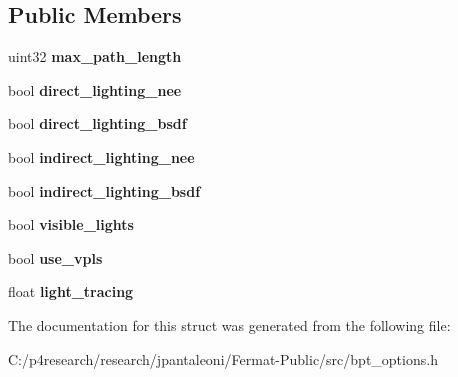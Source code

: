 \subsection*{Public Members}
\begin{DoxyCompactItemize}
\item 
\mbox{\label{struct_b_p_t_options_base_a3d1664d4b59cacc36200da960da90cdc}} 
uint32 {\bfseries max\+\_\+path\+\_\+length}
\item 
\mbox{\label{struct_b_p_t_options_base_aebf1a2d300b1d8876a551310a0199491}} 
bool {\bfseries direct\+\_\+lighting\+\_\+nee}
\item 
\mbox{\label{struct_b_p_t_options_base_a637c3d5ecaccb197f5b9a9c958186b86}} 
bool {\bfseries direct\+\_\+lighting\+\_\+bsdf}
\item 
\mbox{\label{struct_b_p_t_options_base_a486ea1d8e0f3606fa78bc4d9100d2c9b}} 
bool {\bfseries indirect\+\_\+lighting\+\_\+nee}
\item 
\mbox{\label{struct_b_p_t_options_base_ad2396a617d67206009373a02305e3c96}} 
bool {\bfseries indirect\+\_\+lighting\+\_\+bsdf}
\item 
\mbox{\label{struct_b_p_t_options_base_af32a90f054a019535bb4b93ca58cbd65}} 
bool {\bfseries visible\+\_\+lights}
\item 
\mbox{\label{struct_b_p_t_options_base_a32919694ee2c13bf11c66bdbfa4b80e6}} 
bool {\bfseries use\+\_\+vpls}
\item 
\mbox{\label{struct_b_p_t_options_base_a29537d7e05a599a269ece203eb8742a6}} 
float {\bfseries light\+\_\+tracing}
\end{DoxyCompactItemize}


The documentation for this struct was generated from the following file\+:\begin{DoxyCompactItemize}
\item 
C\+:/p4research/research/jpantaleoni/\+Fermat-\/\+Public/src/bpt\+\_\+options.\+h\end{DoxyCompactItemize}
